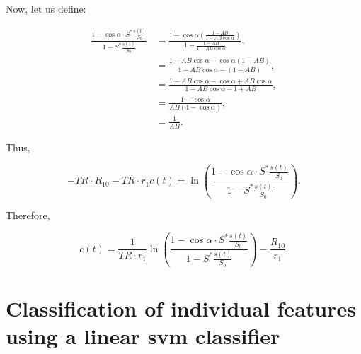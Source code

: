 Now, let us define:

\begin{align}
  \frac{1 - \cos \alpha \cdot S^{*}\frac{s(t)}{S_0}}{1 - S^{*}\frac{s(t)}{S_0}} &= \frac{ 1 - \cos \alpha\left(\frac{1 - A B}{1 - A B \cos \alpha}\right)} {1 - \frac{1 - A B}{1 - A B \cos \alpha}} , \\
  &= \frac{1 - A B \cos \alpha - \cos \alpha(1 - A B)}{1 - A B \cos \alpha - (1 - A B)} , \\
  &= \frac{1 - A B \cos \alpha - \cos \alpha + A B \cos \alpha}{1 - A B \cos \alpha - 1 + A B} , \\
  &= \frac{1 - \cos \alpha}{ A B (1 - \cos \alpha)}, \\
  &= \frac{1}{A B}.
\end{align}

Thus,

\begin{equation}
  -TR \cdot R_{10} -TR \cdot r_1 c(t) = \ln\left( \frac{1 - \cos \alpha \cdot S^{*}\frac{s(t)}{S_0}}{1 - S^{*}\frac{s(t)}{S_0}} \right) .
\end{equation}

Therefore,

\begin{equation}
  c(t) = \frac{1}{TR \cdot r_1} \ln\left( \frac{1 - \cos \alpha \cdot S^{*}\frac{s(t)}{S_0}}{1 - S^{*}\frac{s(t)}{S_0}} \right) - \frac{R_{10}}{r_1} .
\end{equation}

\section{Classification of individual features using a linear
  \acs*{svm} classifier}

